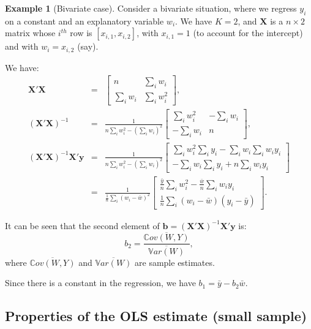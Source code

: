 \documentclass[
  12pt,
]{book}
\theoremstyle{definition}
\theoremstyle{definition}
\newtheorem{example}{Example}[chapter]
\theoremstyle{definition}
\theoremstyle{definition}
\theoremstyle{remark}
\begin{document}
\begin{example}[Bivariate case]
\protect\hypertarget{exm:bivar}{}\label{exm:bivar}Consider a bivariate situation, where we regress \(y_i\) on a constant and an explanatory variable \(w_i\). We have \(K=2\), and \(\mathbf{X}\) is a \(n \times 2\) matrix whose \(i^{th}\) row is \([x_{i,1},x_{i,2}]\), with \(x_{i,1}=1\) (to account for the intercept) and with \(w_i = x_{i,2}\) (say).

We have:
\begin{eqnarray*}
\mathbf{X}'\mathbf{X} &=& 
\left[\begin{array}{cc}
n & \sum_i w_i \\
\sum_i w_i & \sum_i w_i^2
\end{array}
\right],\\
(\mathbf{X}'\mathbf{X})^{-1} &=& 
\frac{1}{n\sum_i w_i^2-(\sum_i w_i)^2}
\left[\begin{array}{cc}
\sum_i w_i^2 & -\sum_i w_i \\
-\sum_i w_i & n
\end{array}
\right],\\
(\mathbf{X}'\mathbf{X})^{-1}\mathbf{X}'\mathbf{y} &=& 
\frac{1}{n\sum_i w_i^2-(\sum_i w_i)^2}
\left[\begin{array}{c}
\sum_i w_i^2\sum_i y_i -\sum_i w_i \sum_i w_iy_i \\
-\sum_i w_i \sum_i y_i + n \sum_i w_i y_i
\end{array}
\right]\\
&=& \frac{1}{\frac{1}{n}\sum_i(w_i - \bar{w})^2}
\left[\begin{array}{c}
\frac{\bar{y}}{n}\sum_i w_i^2 -\frac{\bar{w}}{n}\sum_i w_iy_i \\
\frac{1}{n}\sum_i (w_i-\bar{w})(y_i-\bar{y})
\end{array}
\right].
\end{eqnarray*}

It can be seen that the second element of \(\mathbf{b}=(\mathbf{X}'\mathbf{X})^{-1}\mathbf{X}'\mathbf{y}\) is:
\[
b_2 = \frac{\overline{\mathbb{C}ov(W,Y)}}{\overline{\mathbb{V}ar(W)}},
\]
where \(\overline{\mathbb{C}ov(W,Y)}\) and \(\overline{\mathbb{V}ar(W)}\) are sample estimates.

Since there is a constant in the regression, we have \(b_1 = \bar{y} - b_2 \bar{w}\).
\end{example}

\hypertarget{properties-of-the-ols-estimate-small-sample}{%
\subsection{Properties of the OLS estimate (small sample)}\label{properties-of-the-ols-estimate-small-sample}}
\end{document}
